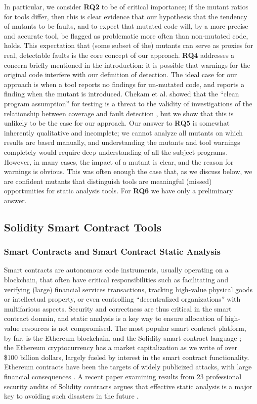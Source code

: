 In particular, we consider {\bf RQ2} to be of critical importance; if the mutant ratios for tools differ, then this is clear evidence that our hypothesis that the tendency of mutants to be faults, and to expect that mutated code will, by a more precise and accurate tool, be flagged as problematic more often than non-mutated code, holds.  This expectation that (some subset of the) mutants can serve as proxies for real, detectable faults is the core concept of our approach.
{\bf RQ4} addresses a concern briefly mentioned in the introduction:  it is possible that warnings for the original code interfere with our definition of detection.  The ideal case for our approach is when a tool reports no findings for un-mutated code, and reports a finding when the mutant is introduced.  Chekam et al. showed that the ``clean program assumption'' for testing is a threat to the validity of investigations of the relationship between coverage and fault detection \cite{CleanProgram}, but we show that this is unlikely to be the case for our approach.  Our answer to {\bf RQ5} is somewhat inherently qualitative and incomplete; we cannot analyze all mutants on which results are based manually, and understanding the mutants and tool warnings completely would require deep understanding of all the subject programs.  However, in many cases, the impact of a mutant is clear, and the reason for warnings is obvious.  This was often enough the case that, as we discuss below, we are confident mutants that distinguish tools are meaningful (missed) opportunities for static analysis tools.
For {\bf RQ6}  we have only a preliminary answer.

\subsection{Solidity Smart Contract Tools}

\subsubsection{Smart Contracts and Smart Contract Static Analysis}

Smart contracts are autonomous code instruments, usually operating on a blockchain, that often have critical responsibilities such as facilitating and verifying (large) financial services transactions, tracking high-value physical goods or intellectual property, or even controlling ``decentralized organizations'' with multifarious aspects.  Security and correctness are thus critical in the smart contract domain, and static analysis is a key way to ensure allocation of high-value resources is not compromised.  The most popular smart contract platform, by far, is the Ethereum blockchain, and the Solidity smart contract language \cite{buterin2013whitepaper,wood2014yellow}; the Ethereum cryptocurrency has a market capitalization as we write of over \$100 billion dollars, largely fueled by interest in the smart contract functionality.  Ethereum contracts have been the targets of widely publicized attacks, with large financial consequences  \cite{spank,DAO}.   A recent paper examining results from 23 professional security audits of Solidity contracts argues that effective static analysis is a major key to avoiding such disasters in the future \cite{FC20}.


